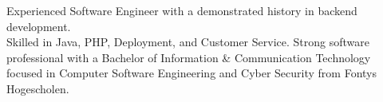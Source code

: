 \vspace{2mm}


\begin{cvparagraph}

Experienced Software Engineer with a demonstrated history in backend development. \\
Skilled in Java, PHP, Deployment, and Customer Service. Strong software professional with a Bachelor of Information \& Communication Technology focused in Computer Software Engineering and Cyber Security from Fontys Hogescholen.
\end{cvparagraph}
